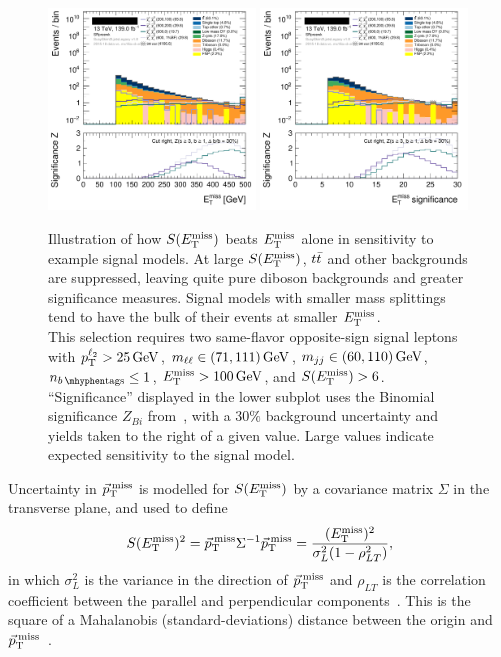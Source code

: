\begin{figure}[tp]
\centering
\includegraphics[width=0.49\textwidth]{figures/2ljets_presel_met_logy.png}
\hfill
\includegraphics[width=0.49\textwidth]{figures/2ljets_presel_met_sig_logy.png}
\caption{
Illustration of how $\metsig$ beats $\met$ alone in sensitivity to
example signal models.
At large $\metsig$, $\ttbar$ and other backgrounds are suppressed, leaving
quite pure diboson backgrounds and greater significance measures.
Signal models with smaller mass splittings tend to have the bulk of their
events at smaller $\met$.
\\[0.5em]
This selection requires two same-flavor opposite-sign signal leptons with
$\pt^{\ell_2} > 25\,\eV[G]$,
$\mll \in (71, 111)\,\eV[G]$,
$\mjj \in (60, 110)\,\eV[G]$,
$\nbtag \leq 1$,
$\met > 100\,\eV[G]$, and
$\metsig > 6$.
\\[0.5em]
``Significance'' displayed in the lower subplot uses the Binomial significance
$Z_{Bi}$ from~\cite{cousins2008evaluation}, with a $30\%$ background
uncertainty and yields taken to the right of a given value.
Large values indicate expected sensitivity to the signal model.
}
\label{fig:2ljets_presel_met}
\end{figure}

Uncertainty in $\ptmiss$ is modelled for $\metsig$ by a covariance matrix
$\Sigma$ in the transverse plane, and used to define
\begin{equation}
\metsig^2
=
\ptmiss \Sigma^{-1} \ptmiss
=
\frac{(\met)^2}{\sigma_L^2(1 - \rho_{LT}^2)}
,
\end{equation}
in which $\sigma_L^2$ is the variance in the direction of $\ptmiss$ and
$\rho_{LT}$ is the correlation coefficient between the parallel and
perpendicular components~\cite{atlas_met_significance}.
This is the square of a Mahalanobis (standard-deviations) distance between
the origin and $\ptmiss$~\cite{mahalanobis1936generalised}.

